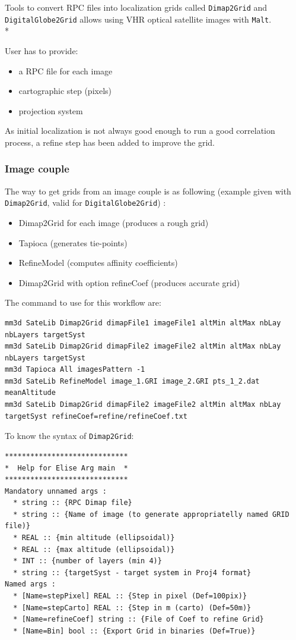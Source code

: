 Tools to convert RPC files into localization grids called {\tt Dimap2Grid} and {\tt DigitalGlobe2Grid} allows using VHR optical satellite images with {\tt Malt}.\\*

User has to provide:
\begin{itemize}
\item a RPC file for each image
\item cartographic step (pixels)
\item projection system
\end{itemize}

As initial localization is not always good enough to run a good correlation process, a refine step has been added to improve the grid.

\subsubsection{Image couple}

The way to get grids from an image couple is as following (example given with {\tt Dimap2Grid}, valid for {\tt DigitalGlobe2Grid}) :

\begin{itemize}
\item Dimap2Grid for each image (produces a rough grid)
\item Tapioca (generates tie-points)
\item RefineModel (computes affinity coefficients)
\item Dimap2Grid with option refineCoef (produces accurate grid)
\end{itemize}

The command to use for this workflow are:
\begin{verbatim}
mm3d SateLib Dimap2Grid dimapFile1 imageFile1 altMin altMax nbLay  nbLayers targetSyst
mm3d SateLib Dimap2Grid dimapFile2 imageFile2 altMin altMax nbLay  nbLayers targetSyst
mm3d Tapioca All imagesPattern -1
mm3d SateLib RefineModel image_1.GRI image_2.GRI pts_1_2.dat meanAltitude
mm3d SateLib Dimap2Grid dimapFile2 imageFile2 altMin altMax nbLay targetSyst refineCoef=refine/refineCoef.txt
\end{verbatim}

To know the syntax of {\tt Dimap2Grid}:
\begin{verbatim}
*****************************
*  Help for Elise Arg main  *
*****************************
Mandatory unnamed args :
  * string :: {RPC Dimap file}
  * string :: {Name of image (to generate appropriatelly named GRID file)}
  * REAL :: {min altitude (ellipsoidal)}
  * REAL :: {max altitude (ellipsoidal)}
  * INT :: {number of layers (min 4)}
  * string :: {targetSyst - target system in Proj4 format}
Named args :
  * [Name=stepPixel] REAL :: {Step in pixel (Def=100pix)}
  * [Name=stepCarto] REAL :: {Step in m (carto) (Def=50m)}
  * [Name=refineCoef] string :: {File of Coef to refine Grid}
  * [Name=Bin] bool :: {Export Grid in binaries (Def=True)}

\end{verbatim}


